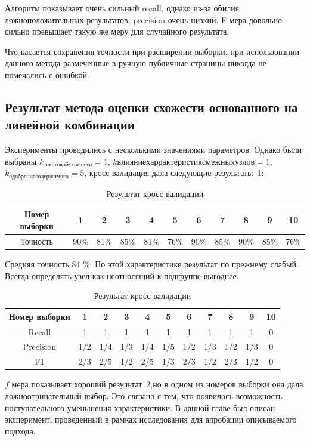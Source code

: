 \documentclass[annotation,times,page4]{itmo-student-thesis}
\begin{document}
Алгоритм показывает очень сильный recall, однако из-за обилия ложноположительных результатов, precision очень низкий. F-мера довольно сильно превышает такую же меру для случайного результата.
 

Что касается сохранения точности при расширении выборки, при использовании данного метода размеченные в ручную публичные страницы никогда не помечались с ошибкой.

\subsection{Результат метода оценки схожести основанного на линейной комбинации}
Эксперименты проводились с несколькими значениями параметров. Однако были выбраны $k_{текстовой схожести} = 1$, $k{влияние харрактеристик смежных узлов}=1$, $k_{одобрение содержимого}=5$,  
кросс-валидация дала следующие результаты~\ref{tab1}:
\begin{table}[!h]
\caption{Результат кросс валидации}\label{tab1}
\centering
\begin{tabular}{|*{11}{c|}}\hline
Номер выборки & 1 & 2 & 3 & 4 & 5 & 6 & 7 & 8 & 9 & 10 \\\hline
Точность  & 90\% & 81\% & 85\% & 81\% & 76\% & 90\% & 85\% & 90\% & 85\% & 76\% \\\hline
\end{tabular}
\end{table}

Средняя точность 84 \%. По этой характеристике результат по прежнему слабый. Всегда определять узел как неотносящий к подгруппе выгоднее.

\begin{table}[!h]
\caption{Результат кросс валидации}\label{tab4}
\centering
\begin{tabular}{|*{11}{c|}}\hline
Номер выборки & 1 & 2 & 3 & 4 & 5 & 6 & 7 & 8 & 9 & 10 \\\hline
Recall  & 1& 1& 1& 1& 1& 1& 1& 1& 1& 0\\\hline
Precision & 1/2 & 1/4 & 1/3 & 1/4 & 1/5 & 1/2 & 1/3 & 1/2 & 1/3 & 0\\\hline
F1        & 2/3 & 2/5 & 1/2 & 2/5 & 1/3 & 2/3 & 1/2 & 2/3 & 1/2 & 0 \\\hline

\end{tabular}
\end{table}

$f$ мера показывает хороший результат~\ref{tab4},но в одном из номеров выборки она дала ложноотрицательный выбор. Это связано с тем, что появилось возможность поступательного уменьшения характеристики.
\chapterconclusion
В данной главе был описан эксперимент, проведенный в рамках исследования для апробации описываемого подхода.
\end{document}
